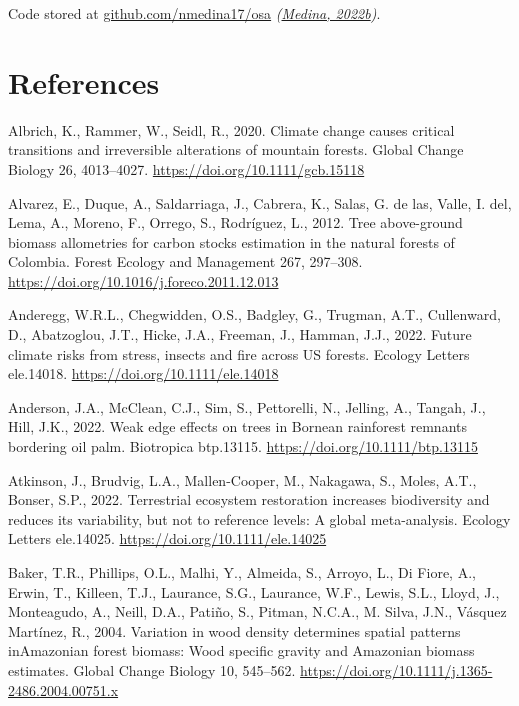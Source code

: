 \documentclass[
  12pt,
]{article}
\newlength{\cslhangindent}
\newlength{\cslentryspacingunit} %
\newenvironment{CSLReferences}[2] %
 {%
  \setlength{\parindent}{0pt}
  \ifodd #1
  \let\oldpar\par
  \def\par{\hangindent=\cslhangindent\oldpar}
  \fi
  \setlength{\parskip}{#2\cslentryspacingunit}
 }%
 {}
\begin{document}
Code stored at \href{github.com/nmedin17/osa}{github.com/nmedina17/osa} \emph{(\protect\hyperlink{ref-softwareMedina22osa}{Medina, 2022b})}.

\newpage

\hypertarget{references}{%
\section*{References}\label{references}}

\hypertarget{refs}{}
\begin{CSLReferences}{1}{0}
\leavevmode{}%
Albrich, K., Rammer, W., Seidl, R., 2020. Climate change causes critical transitions and irreversible alterations of mountain forests. Global Change Biology 26, 4013--4027. \url{https://doi.org/10.1111/gcb.15118}

\leavevmode{}%
Alvarez, E., Duque, A., Saldarriaga, J., Cabrera, K., Salas, G. de las, Valle, I. del, Lema, A., Moreno, F., Orrego, S., Rodríguez, L., 2012. Tree above-ground biomass allometries for carbon stocks estimation in the natural forests of {Colombia}. Forest Ecology and Management 267, 297--308. \url{https://doi.org/10.1016/j.foreco.2011.12.013}

\leavevmode{}%
Anderegg, W.R.L., Chegwidden, O.S., Badgley, G., Trugman, A.T., Cullenward, D., Abatzoglou, J.T., Hicke, J.A., Freeman, J., Hamman, J.J., 2022. Future climate risks from stress, insects and fire across {US} forests. Ecology Letters ele.14018. \url{https://doi.org/10.1111/ele.14018}

\leavevmode{}%
Anderson, J.A., McClean, C.J., Sim, S., Pettorelli, N., Jelling, A., Tangah, J., Hill, J.K., 2022. Weak edge effects on trees in {Bornean} rainforest remnants bordering oil palm. Biotropica btp.13115. \url{https://doi.org/10.1111/btp.13115}

\leavevmode{}%
Atkinson, J., Brudvig, L.A., Mallen-Cooper, M., Nakagawa, S., Moles, A.T., Bonser, S.P., 2022. Terrestrial ecosystem restoration increases biodiversity and reduces its variability, but not to reference levels: {A} global meta-analysis. Ecology Letters ele.14025. \url{https://doi.org/10.1111/ele.14025}

\leavevmode{}%
Baker, T.R., Phillips, O.L., Malhi, Y., Almeida, S., Arroyo, L., Di Fiore, A., Erwin, T., Killeen, T.J., Laurance, S.G., Laurance, W.F., Lewis, S.L., Lloyd, J., Monteagudo, A., Neill, D.A., Patiño, S., Pitman, N.C.A., M. Silva, J.N., Vásquez Martínez, R., 2004. Variation in wood density determines spatial patterns {inAmazonian} forest biomass: {Wood} specific gravity and {Amazonian} biomass estimates. Global Change Biology 10, 545--562. \url{https://doi.org/10.1111/j.1365-2486.2004.00751.x}


\end{CSLReferences}
\end{document}
